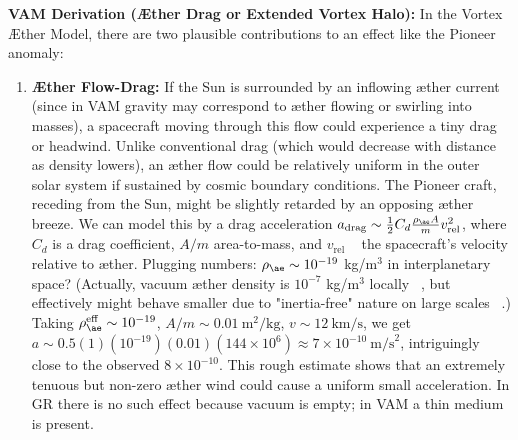 \documentclass[a4paper, aps,preprint,superscriptaddress, 12pt]{revtex4}
\begin{document}
\textbf{VAM Derivation (Æther Drag or Extended Vortex Halo):} In the Vortex Æther Model, there are two plausible contributions to an effect like the Pioneer anomaly:


\begin{enumerate}

\item
\textbf{Æther Flow-Drag:} If the Sun is surrounded by an inflowing æther current (since in VAM gravity may correspond to æther flowing or swirling into masses), a spacecraft moving through this flow could experience a tiny drag or headwind. Unlike conventional drag (which would decrease with distance as density lowers), an æther flow could be relatively uniform in the outer solar system if sustained by cosmic boundary conditions. The Pioneer craft, receding from the Sun, might be slightly retarded by an opposing æther breeze. We can model this by a drag acceleration $a_{\text{drag}} \sim \frac{1}{2}C_d \frac{\rho_{\ae} A}{m} v_{\text{rel}}^2$, where $C_d$ is a drag coefficient, $A/m$ area-to-mass, and $v_{\text{rel}}$ ~ the spacecraft’s velocity relative to æther. Plugging numbers: $\rho_{\ae}\sim10^{-19}$ kg/m$^3$ in interplanetary space? (Actually, vacuum æther density is $10^{-7}$ kg/m$^3$ locally~\cite{VAM_constants} , but effectively might behave smaller due to "inertia-free" nature on large scales~\cite{Iskandarani2025b} .) Taking $\rho_{\ae}^{\text{eff}}\sim10^{-19}$, $A/m\sim0.01~\text{m}^2/\text{kg}$, $v\sim12~\text{km/s}$, we get $a\sim0.5(1)(10^{-19})(0.01)(144\times10^6) \approx7\times10^{-10}~\text{m/s}^2$, intriguingly close to the observed $8\times10^{-10}$. This rough estimate shows that an extremely tenuous but non-zero æther wind could cause a uniform small acceleration. In GR there is no such effect because vacuum is empty; in VAM a thin medium is present.





\end{enumerate}
\end{document}
